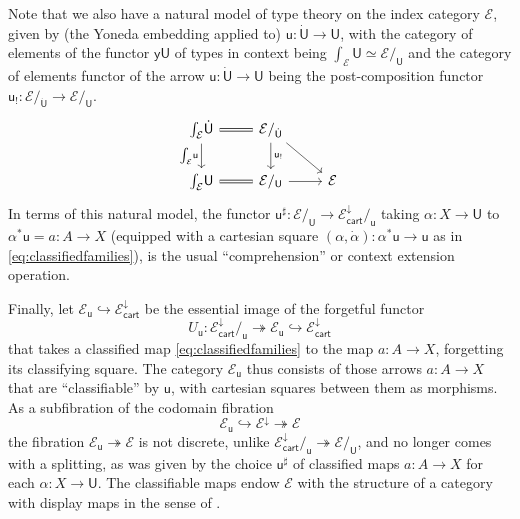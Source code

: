 \documentclass[12pt,reqno]{amsart}
\newcommand{\EE}{\ensuremath{\mathcal{E}}}
\newcommand{\y}{\ensuremath{\mathsf{y}}} %
\newcommand{\hook}{\ensuremath{\hookrightarrow}}
\renewcommand{\epi}{\ensuremath{\twoheadrightarrow}}
\renewcommand{\to}{\ensuremath{\rightarrow}}
\renewcommand{\u}{\ensuremath{\mathsf{u}}}
\renewcommand{\t}{\ensuremath{\mathsf{u}}}
\newcommand{\T}{\ensuremath{\mathsf{U}}}
\newcommand{\TT}{\ensuremath{\dot{\mathsf{U}}}}
\theoremstyle{remark}
\theoremstyle{definition}
\begin{document}
Note that we also have a natural model of type theory on the index category $\EE$, given by (the Yoneda embedding applied to) $\t: \TT \to \T$, with the category of elements of the functor $\y\T$ of types in context being $\int_{\EE}\!\T \simeq \EE/_\T$ and the category of elements functor of the arrow $\t: \TT \to \T$ being the post-composition functor $\t_{!} : \EE/_{\TT} \to \EE/_{\T}$.
 \begin{equation}\label{eq:sliceadjunctionelements}
\begin{tikzcd}
\int_{\EE}\!\TT \ar[d,swap, "{\int_{\EE}\!\t}"] \ar[r, equals] & \EE/_{\TT} \ar[d, "{\t_{!}}"] \ar[rd] & \\
 \int_{\EE}\!\T \ar[r,equals] &  \EE/_\T \ar[r] & \EE
 \end{tikzcd}
 \end{equation}
 In terms of this natural model, the functor $\t^{\sharp} : \EE/_\T \to \EE^{\downarrow}_{\mathsf{cart}}/_{\t}$ taking $\alpha : X \to \T$ to $\alpha^*\t = a: A \to X$ (equipped with a cartesian square $(\alpha, \dot{\alpha}) : \alpha^*\t \to \t$ as in \eqref{eq:classifiedfamilies}), is the usual ``comprehension'' or context extension operation.
 
Finally, let $\EE_\t \hook  \EE^{\downarrow}_{\mathsf{cart}}$ be the essential image of the forgetful functor 
\[
U_\t :  \EE^{\downarrow}_{\mathsf{cart}}/_{\t} \twoheadrightarrow \EE_\t \hook \EE^{\downarrow}_{\mathsf{cart}}
\]
that takes a classified map \eqref{eq:classifiedfamilies} to the map $a : A \to X$, forgetting its classifying square.  
The category $\EE_\t$ thus consists of those arrows $a:A \to X$ that are ``classifiable'' by $\t$, with cartesian squares between them as morphisms. As a subfibration of the codomain fibration $$\EE_\t \hook \EE^\downarrow \epi \EE$$ the fibration $\EE_\t \epi \EE$ is not discrete, unlike $\EE^{\downarrow}_{\mathsf{cart}}/_{\t} \twoheadrightarrow \EE/_\T$, and %
no longer comes with a splitting, as was given by the choice $\u^\sharp$ of classified maps $a : A\to X$ for each $\alpha : X \to \T$.  The classifiable maps endow $\EE$ with the structure of a category with display maps in the sense of \cite{Taylor:PFM}.  
\end{document}
